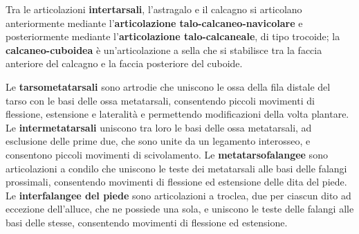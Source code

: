 Tra le articolazioni \textbf{intertarsali}, l'astragalo e il calcagno si
articolano anteriormente mediante l'\textbf{articolazione
talo-calcaneo-navicolare} e posteriormente mediante
l'\textbf{articolazione talo-calcaneale}, di tipo trocoide; la
\textbf{calcaneo-cuboidea} è un'articolazione a sella che si stabilisce tra
la faccia anteriore del calcagno e la faccia posteriore del cuboide.

Le \textbf{tarsometatarsali} sono artrodie che uniscono le ossa della fila
distale del tarso con le basi delle ossa metatarsali, consentendo piccoli
movimenti di flessione, estensione e lateralità e permettendo
modificazioni della volta plantare. Le \textbf{intermetatarsali} uniscono
tra loro le basi delle ossa metatarsali, ad esclusione delle prime due,
che sono unite da un legamento interosseo, e consentono piccoli movimenti
di scivolamento. Le \textbf{metatarsofalangee} sono articolazioni a
condilo che uniscono le teste dei metatarsali alle basi delle falangi
prossimali, consentendo movimenti di flessione ed estensione delle dita
del piede. Le \textbf{interfalangee del piede} sono articolazioni a
troclea, due per ciascun dito ad eccezione dell'alluce, che ne possiede
una sola, e uniscono le teste delle falangi alle basi delle stesse,
consentendo movimenti di flessione ed estensione.
